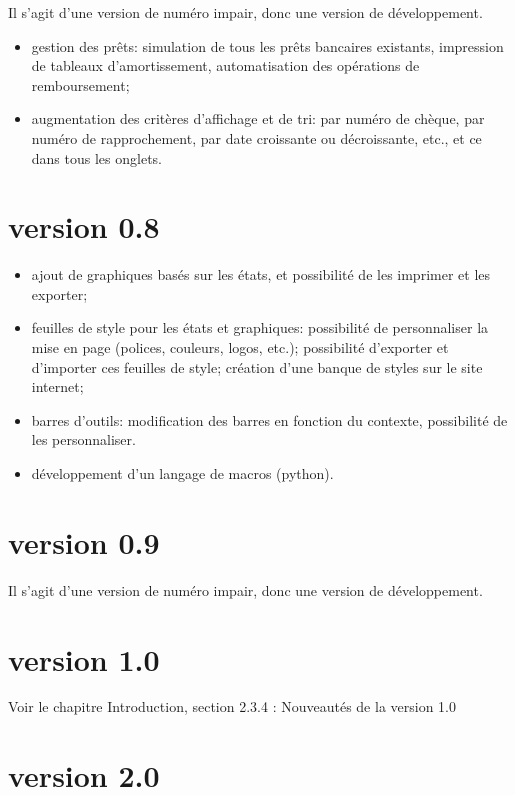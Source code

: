Il s'agit d'une version de numéro impair, donc une version de développement.

\begin{itemize}
	\item gestion des prêts: simulation de tous les prêts bancaires existants, impression de tableaux d'amortissement, automatisation des opérations de remboursement;	
	\item augmentation des critères d'affichage et de tri: par numéro de chèque,
	par numéro de rapprochement, par date croissante ou décroissante, etc., et ce dans tous les onglets.
\end{itemize}


\section{version 0.8}

\begin{itemize}
	\item ajout de graphiques basés sur les états, et possibilité de les imprimer et les exporter;	
	\item feuilles de style pour les états et graphiques: possibilité de personnaliser la mise en page (polices, couleurs, logos, etc.); possibilité d'exporter et d'importer ces feuilles de style; création d'une banque de styles sur le site internet;	
	\item barres d'outils: modification des barres en fonction du contexte, possibilité de les personnaliser.
	\item développement d'un langage de macros (python).
\end{itemize}

\section{version 0.9}

Il s'agit d'une version de numéro impair, donc une version de développement.


\section{version 1.0}

Voir le chapitre Introduction, section 2.3.4 : Nouveautés de la version 1.0


\section{version 2.0}

